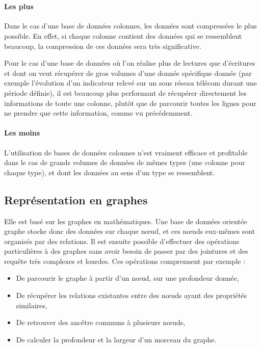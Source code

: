 \documentclass[a4paper,11pt]{article}
\begin{document}
	~\\
		\paragraph{Les plus}
		Dans le cas d’une base de données colonnes, les données sont compressées le plus possible. En effet, si chaque colonne contient des données qui se ressemblent beaucoup, la compression de ces données sera très significative.

		Pour le cas d’une base de données où l’on réalise plus de lectures que d’écritures et dont on veut récupérer de gros volumes d’une donnée spécifique donnée (par exemple l’évolution d’un indicateur relevé sur un sous réseau télécom durant une période définie), il est beaucoup plus performant de 
récupérer directement les informations de toute une colonne, plutôt que de parcourir toutes les lignes pour ne prendre que cette information, comme vu précédemment.

		\paragraph{Les moins}
		L’utilisation de bases de données colonnes n’est vraiment efficace et profitable dans le cas de grands volumes de données de mêmes types (une colonne pour chaque type), et dont les données au sens d’un type se ressemblent.

		\subsection{Représentation en graphes}
		Elle est basé sur les graphes en mathématiques. Une base de données orientée graphe stocke donc des données sur chaque n\oe{}ud, et ces nœuds eux-mêmes sont organisés par des relations. Il est ensuite possible d'effectuer des opérations particulières à des graphes sans avoir besoin de passer par des jointures et des requête très complexes et lourdes. Ces opérations comprennent par exemple :\\

		\begin{itemize}
			\item De parcourir le graphe à partir d'un n\oe{}ud, sur une profondeur donnée,
			\item De récupérer les relations existantes entre des nœuds ayant des propriétés similaires,
			\item De retrouver des \og{}ancêtre\fg{} communs à plusieurs n\oe{}uds,
			\item De calculer la profondeur et la largeur d'un morceau du graphe.
		\end{itemize}
\end{document}
